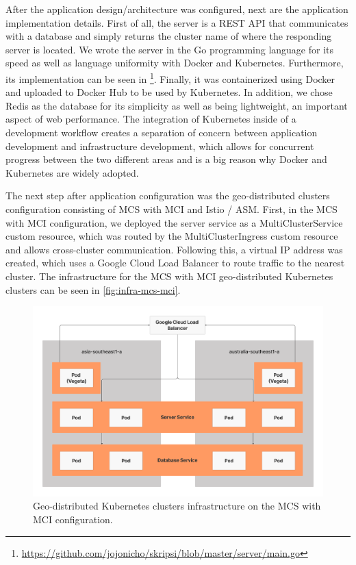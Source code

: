 After the application design/architecture was configured, next are the application implementation details. First of all, the server is a REST API that communicates with a database and simply returns the cluster name of where the responding server is located. We wrote the server in the Go programming language for its speed as well as language uniformity with Docker and Kubernetes. Furthermore, its implementation can be seen in \footnote{\url{https://github.com/jojonicho/skripsi/blob/master/server/main.go}}. Finally, it was containerized using Docker and uploaded to Docker Hub to be used by Kubernetes. In addition, we chose Redis as the database for its simplicity as well as being lightweight, an important aspect of web performance. The integration of Kubernetes inside of a development workflow creates a separation of concern between application development and infrastructure development, which allows for concurrent progress between the two different areas and is a big reason why Docker and Kubernetes are widely adopted.

The next step after application configuration was the geo-distributed clusters configuration consisting of MCS with MCI and Istio / ASM. First, in the MCS with MCI configuration, we deployed the server service as a MultiClusterService custom resource, which was routed by the MultiClusterIngress custom resource and allows cross-cluster communication. Following this, a virtual IP address was created, which uses a Google Cloud Load Balancer to route traffic to the nearest cluster. The infrastructure for the MCS with MCI geo-distributed Kubernetes clusters can be seen in \autoref{fig:infra-mcs-mci}.

\begin{figure}
	\centering
	\includegraphics[width=1\textwidth]{assets/diagrams/infra-mcs-mci.png}
	\caption{Geo-distributed Kubernetes clusters infrastructure on the MCS with MCI configuration.}
	\label{fig:infra-mcs-mci}
\end{figure}

